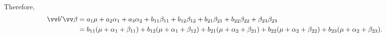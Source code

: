 Therefore,
\begin{align*}
    \Vector{b}'\Vector{\beta}
     & =a_1\mu+a_2\alpha_1+a_3\alpha_2+b_{11}\beta_{11}+b_{12}\beta_{12}+b_{21}\beta_{21}
    +b_{22}\beta_{22}+\beta_{23}\beta_{23}                                                                                                                               \\
     & =b_{11}(\mu+\alpha_1+\beta_{11})+b_{12}(\mu+\alpha_1+\beta_{12})+b_{21}(\mu+\alpha_2+\beta_{21})+b_{22}(\mu+\alpha_2+\beta_{22})+b_{23}(\mu+\alpha_2+\beta_{23}).
\end{align*}